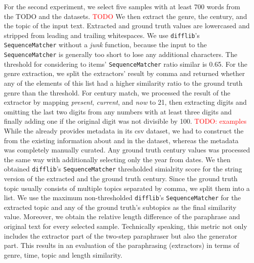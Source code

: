 For the second experiment, we select five samples with at least 700 words from the \dataBlog{} TODO \dataGutenberg{} and the \dataStudent{} datasets. \textcolor{red}{TODO}
We then extract the genre, the century, and the topic of the input text.
Extracted and ground truth values are lowercased and stripped from leading and trailing whitespaces. 
We use \texttt{difflib}'s \texttt{SequenceMatcher} without a \textit{junk} function, because the input to the \texttt{SequenceMatcher} is generally too short to lose any additional characters.
The threshold for considering to items' \texttt{SequenceMatcher} ratio similar is 0.65.
For the genre extraction, we split the extractors' result by comma and returned whether any of the elements of this list had a higher similarity ratio to the ground truth genre than the threshold.
For century match, we processed the result of the extractor by mapping \textit{present}, \textit{current}, and \textit{now} to 21, then extracting digits and omitting the last two digits from any numbers with at least three digits and finally adding one if the original digit was not divisible by 100.
\textcolor{red}{TODO: examples}
While the \dataBlog{} already provides metadata in its csv dataset, we had to construct the \dataStudent{} from the existing information about and in the dataset, whereas the \dataGutenberg{} metadata was completely manually curated.
Any ground truth century values was processed the same way with additionally selecting only the year from dates.
We then obtained \texttt{difflib}'s \texttt{SequenceMatcher} thresholded simialrity score for the string version of the extracted and the ground truth century.
Since the ground truth topic usually consists of multiple topics separated by comma, we split them into a list.
We use the maximum non-thresholded \texttt{difflib}'s \texttt{SequenceMatcher} for the extracted topic and any of the ground truth's subtopics as the final similarity value.
Moreover, we obtain the relative length difference of the paraphrase and original text for every selected sample. 
Technically speaking, this metric not only includes the extractor part of the two-step paraphraser but also the generator part.
This results in an evaluation of the paraphrasing (extractors) in terms of genre, time, topic and length similarity.